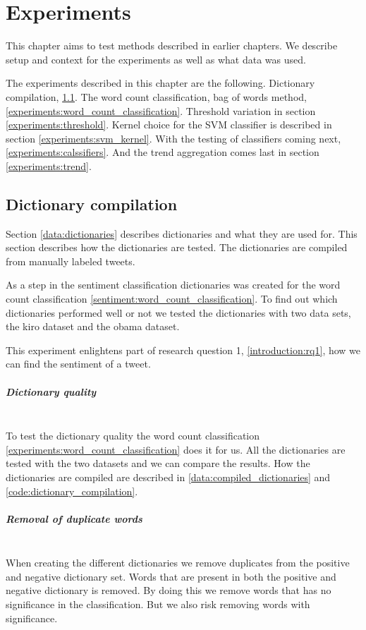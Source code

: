 \chapter{Experiments}\label{experiments}
This chapter aims to test methods described in earlier chapters. We describe
setup and context for the experiments as well as what data was used.

The experiments described in this chapter are the following. Dictionary
compilation, \ref{experiments:dictionaries}. The word count classification, bag
of words method, \ref{experiments:word_count_classification}. Threshold
variation in section \ref{experiments:threshold}. Kernel choice for the SVM
classifier is described in section \ref{experiments:svm_kernel}. With the
testing of classifiers coming next, \ref{experiments:calssifiers}. And the trend
aggregation comes last in section \ref{experiments:trend}.

\section{Dictionary compilation}\label{experiments:dictionaries}
Section \ref{data:dictionaries} describes dictionaries and what they are used
for. This section describes how the dictionaries are tested. 
The dictionaries are compiled from manually labeled tweets.

As a step in the sentiment classification dictionaries was created for the
word count classification \ref{sentiment:word_count_classification}.
To find out which dictionaries performed well or not we tested the dictionaries
with two data sets, the kiro dataset and the obama dataset. 

This experiment enlightens part of research question 1,
\ref{introduction:rq1}, how we can find the sentiment of a tweet.

\paragraph{Dictionary quality}
\hspace{0pt}\\
To test the dictionary quality the word count classification
\ref{experiments:word_count_classification} does it for us. All the
dictionaries are tested with the two datasets and we can compare the results. 
How the dictionaries are compiled are described in
\ref{data:compiled_dictionaries} and \ref{code:dictionary_compilation}.

\paragraph{Removal of duplicate words}
\hspace{0pt}\\
When creating the different dictionaries we remove duplicates from the positive
and negative dictionary set. Words that are present in both the positive and
negative dictionary is removed. By doing this we remove words that has no
significance in the classification. But we also risk removing words with
significance.

